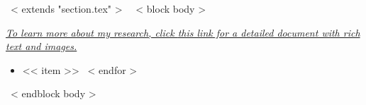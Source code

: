 ~< extends "section.tex" >~
~< block body >~
\begin{tcolorbox}[colback=blue!5!white, colframe=note_highlight, boxrule=0.2mm, left=1mm, right=1mm, bottom=1mm, title=Research Overview]
  \href{https://gjchen.notion.site/}{\textcolor{note_highlight}{\textit{To learn more about my research, click \underline{this link} for a detailed document with rich text and images.}}}
\end{tcolorbox}
\begin{itemize}
  ~< for item in items >~
        \item << item >>
  ~< endfor >~
\end{itemize}
~< endblock body >~
